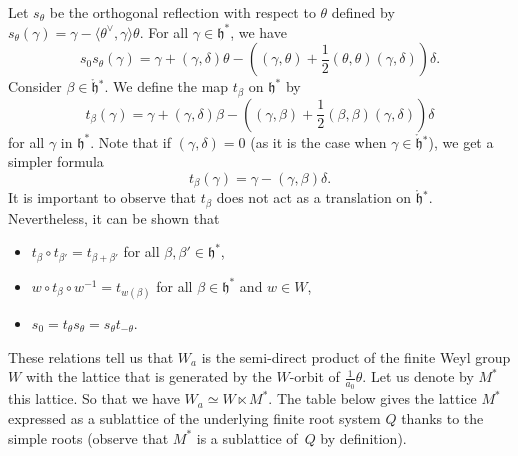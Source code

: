 \documentclass[pdftex]{sigma}
\numberwithin{equation}{section}
\newcommand{\ga}{\gamma}
\newcommand{\fh}{\mathfrak{h}}
\newcommand{\scal}[2]{\langle #1,#2\rangle}
\begin{document}
Let $s_\theta$ be the orthogonal reflection with respect to $\theta$ defined by $s_\theta(\ga) = \ga - \scal{\theta^\vee}{\ga}\theta$. For all $\ga\in \fh^\ast$, we have
\[
s_0s_{\theta}(\ga)= \gamma +(\ga,\delta)\theta - \left((\ga,\theta)+\frac{1}{2}(\theta,\theta)(\ga,\delta)\right)\delta.
\]
Consider $\beta\in \mathring{\fh}{}^\ast$. We define the map $t_\beta$ on $\fh^\ast$ by
\[
t_{\beta}(\gamma) = \gamma +(\gamma,\delta)\beta - \left((\gamma,\beta)+\frac{1}{2}(\beta,\beta)(\gamma,\delta)\right)\delta
\]
for all $\gamma$ in $\fh^\ast$.
Note that if $(\ga,\delta) = 0$ (as it is the case when $\ga\in \mathring{\fh}{}^\ast$), we get a simpler formula
\[
t_{\beta}(\gamma) = \gamma - (\gamma,\beta)\delta.
\]
It is important to observe that $t_{\beta}$ does not act as a translation on $\mathring{\fh}{}^\ast$.
Nevertheless, it can be shown that
\begin{itemize}\itemsep=0pt
\item  $t_\beta\circ t_{\beta'}=t_{\beta+\beta'}$ for all $\beta,\beta'\in \fh^\ast$,
\item  $w\circ t_{\beta} \circ w^{-1} = t_{w(\beta)}$ for all $\beta\in \fh^\ast$ and $w\in W$,
\item  $s_{0}=t_{\theta}s_{\theta}=s_{\theta}t_{-\theta}$.
\end{itemize}
These relations tell us that $W_a$ is the semi-direct product of the finite Weyl group $W$ with the lattice that is generated by the $W$-orbit of $\frac{1}{a_0}\theta$. Let us denote by $M^{*}$ this lattice. So that we have
$W_a\simeq W\ltimes M^{*}$.
The table below gives the lattice $M^{*}$ expressed as a sublattice of the underlying finite root system $Q$ thanks to the simple roots (observe that $M^{*}$ is a sublattice of~$Q$ by definition).
\end{document}

